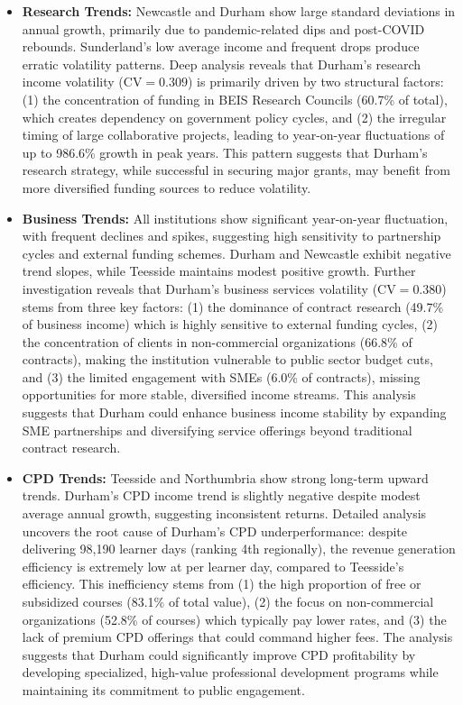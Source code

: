 \documentclass[journal,onecolumn, 10pt,draftclsnofoot]{IEEEtran}
\begin{document}
\begin{itemize}
    \item \textbf{Research Trends:} Newcastle and Durham show large standard deviations in annual growth, primarily due to pandemic-related dips and post-COVID rebounds. Sunderland's low average income and frequent drops produce erratic volatility patterns. Deep analysis reveals that Durham's research income volatility ($\mathrm{CV}=0.309$) is primarily driven by two structural factors: (1) the concentration of funding in BEIS Research Councils (60.7\% of total), which creates dependency on government policy cycles, and (2) the irregular timing of large collaborative projects, leading to year-on-year fluctuations of up to 986.6\% growth in peak years. This pattern suggests that Durham's research strategy, while successful in securing major grants, may benefit from more diversified funding sources to reduce volatility.
    
    \item \textbf{Business Trends:} All institutions show significant year-on-year fluctuation, with frequent declines and spikes, suggesting high sensitivity to partnership cycles and external funding schemes. Durham and Newcastle exhibit negative trend slopes, while Teesside maintains modest positive growth. Further investigation reveals that Durham's business services volatility ($\mathrm{CV}=0.380$) stems from three key factors: (1) the dominance of contract research (49.7\% of business income) which is highly sensitive to external funding cycles, (2) the concentration of clients in non-commercial organizations (66.8\% of contracts), making the institution vulnerable to public sector budget cuts, and (3) the limited engagement with SMEs (6.0\% of contracts), missing opportunities for more stable, diversified income streams. This analysis suggests that Durham could enhance business income stability by expanding SME partnerships and diversifying service offerings beyond traditional contract research.
    
    \item \textbf{CPD Trends:} Teesside and Northumbria show strong long-term upward trends. Durham's CPD income trend is slightly negative despite modest average annual growth, suggesting inconsistent returns. Detailed analysis uncovers the root cause of Durham's CPD underperformance: despite delivering 98,190 learner days (ranking 4th regionally), the revenue generation efficiency is extremely low at  per learner day, compared to Teesside's  efficiency. This inefficiency stems from (1) the high proportion of free or subsidized courses (83.1\% of total value), (2) the focus on non-commercial organizations (52.8\% of courses) which typically pay lower rates, and (3) the lack of premium CPD offerings that could command higher fees. The analysis suggests that Durham could significantly improve CPD profitability by developing specialized, high-value professional development programs while maintaining its commitment to public engagement.
    

\end{itemize}
\end{document}
